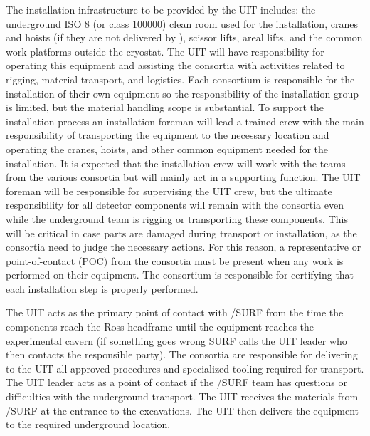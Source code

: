 The installation infrastructure to be provided by the UIT includes:
the underground ISO 8 (or class \num{100000}) clean room used for the
installation, cranes and hoists (if they are not delivered by
), scissor lifts, areal lifts, and the common work
platforms outside the cryostat. The UIT will have responsibility for
operating this equipment and assisting the consortia with activities
related to rigging, material transport, and logistics. Each consortium
is responsible for the installation of their own equipment so the
responsibility of the installation group is limited, but the material
handling scope is substantial. To support the installation process an
installation foreman will lead a trained crew with the main
responsibility of transporting the equipment to the necessary location
and operating the cranes, hoists, and other common equipment needed
for the installation. It is expected that the installation crew will
work with the teams from the various consortia but will mainly act in
a supporting function. The UIT foreman will be responsible for
supervising the UIT crew, but the ultimate responsibility for all
detector components will remain with the consortia even while the
underground team is rigging or transporting these components.  This
will be critical in case parts are damaged during transport or
installation, as the consortia need to judge the necessary
actions. For this reason, a representative or point-of-contact (POC)
from the consortia must be present when any work is performed on their
equipment. The consortium is responsible for certifying that each
installation step is properly performed.

The UIT acts as the primary point of contact with /SURF
from the time the components reach the Ross headframe until the
equipment reaches the experimental cavern (if something goes wrong
SURF calls the UIT leader who then contacts the responsible
party). The consortia are responsible for delivering to the UIT all
approved procedures and specialized tooling required for
transport. The UIT leader acts as a point of contact if the
/SURF team has questions or difficulties with the
underground transport.  The UIT receives the materials from
/SURF at the entrance to the  excavations. The
UIT then delivers the equipment to the required underground location.

